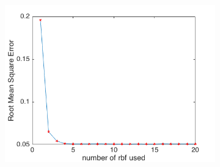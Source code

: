 \documentclass{article}
\begin{document}
\begin{enumerate}[label=(\alph*)]
\begin{figure}[htbp]
				 		\begin{subfigure}{0.5\textwidth}
				 			\includegraphics[width=\linewidth]{images/p1-3-a_1_20.png}
				 			\caption{}
				 			\label{fig:p-1-3-a_c}
				 		\end{subfigure}


\end{figure}
\end{enumerate}
\end{document}
